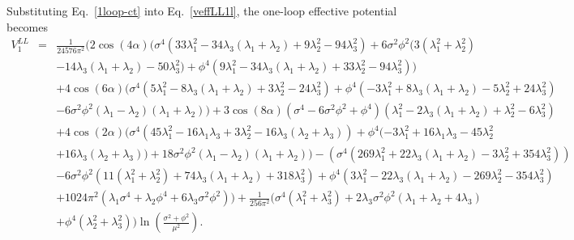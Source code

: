 \documentclass[11pt,a4paper,english,superscriptaddress,preprint,aps,prd]{revtex4}
\begin{document}
Substituting Eq.~\eqref{1loop-ct} into Eq.~\eqref{veffLL1l}, the one-loop effective potential becomes
\begin{eqnarray}\label{renormalized_1loop}
 V^{LL}_1 &=& \frac{1}{24576 \pi ^2}\Bigr(2 \cos (4 \alpha ) (\sigma ^4 \left(33 \lambda_1^2-34 \lambda_3 (\lambda_1+\lambda_2)+9 \lambda_2^2-94 \lambda_3^2\right)+6 \sigma ^2 \phi ^2 (3 \left(\lambda_1^2+\lambda_2^2\right)\nonumber\\
 &&-14 \lambda_3 (\lambda_1+\lambda_2)-50 \lambda_3^2)+\phi ^4 \left(9 \lambda_1^2-34 \lambda_3 (\lambda_1+\lambda_2)+33 \lambda_2^2-94 \lambda_3^2\right))\nonumber\\
 &&+4 \cos (6 \alpha ) (\sigma ^4 \left(5 \lambda_1^2-8 \lambda_3 (\lambda_1+\lambda_2)+3 \lambda_2^2-24 \lambda_3^2\right)+\phi ^4 \left(-3 \lambda_1^2+8 \lambda_3 (\lambda_1+\lambda_2)-5 \lambda_2^2+24 \lambda_3^2\right)\nonumber\\
 &&-6 \sigma ^2 \phi ^2 (\lambda_1-\lambda_2) (\lambda_1+\lambda_2))+3 \cos (8 \alpha ) \left(\sigma ^4-6 \sigma ^2 \phi ^2+\phi ^4\right) \left(\lambda_1^2-2 \lambda_3 (\lambda_1+\lambda_2)+\lambda_2^2-6 \lambda_3^2\right)\nonumber\\
 &&+4 \cos (2 \alpha ) (\sigma ^4 \left(45 \lambda_1^2-16 \lambda_1 \lambda_3+3 \lambda_2^2-16 \lambda_3 (\lambda_2+\lambda_3)\right)+\phi ^4 (-3 \lambda_1^2+16 \lambda_1 \lambda_3-45 \lambda_2^2\nonumber\\
 &&+16 \lambda_3 (\lambda_2+\lambda_3))+18 \sigma ^2 \phi ^2 (\lambda_1-\lambda_2) (\lambda_1+\lambda_2))-\left(\sigma ^4 \left(269 \lambda_1^2+22 \lambda_3 (\lambda_1+\lambda_2)-3 \lambda_2^2+354 \lambda_3^2\right)\right)\nonumber\\
 &&-6 \sigma ^2 \phi ^2 \left(11 \left(\lambda_1^2+\lambda_2^2\right)+74 \lambda_3 (\lambda_1+\lambda_2)+318 \lambda_3^2\right)+\phi ^4 \left(3 \lambda_1^2-22 \lambda_3 (\lambda_1+\lambda_2)-269 \lambda_2^2-354 \lambda_3^2\right)\nonumber\\
 &&+1024 \pi ^2 \left(\lambda_1\sigma ^4+\lambda_2 \phi ^4+6 \lambda_3 \sigma ^2 \phi ^2\right)\Bigr)+\frac{1}{256 \pi ^2} \Bigr(\sigma ^4 \left(\lambda_1^2+\lambda_3^2\right)+2 \lambda_3 \sigma ^2 \phi ^2 (\lambda_1+\lambda_2+4 \lambda_3)\nonumber\\
 &&+\phi ^4 \left(\lambda_2^2+\lambda_3^2\right)\Bigr)\ln \left(\frac{\sigma ^2+\phi ^2}{\mu ^2}\right).
\end{eqnarray}
\end{document}
